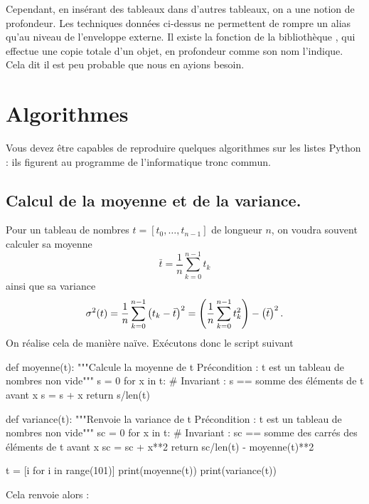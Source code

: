 Cependant, en insérant des tableaux dans d'autres tableaux, on a une notion de \og profondeur\fg. Les 
techniques données ci-dessus ne permettent de rompre un alias qu'au niveau de l'enveloppe externe. 
Il existe la fonction  de la bibliothèque , qui effectue une copie totale 
d'un objet, en profondeur comme son nom l'indique. Cela dit il est peu probable que nous en ayions 
besoin.

\section{Algorithmes}

Vous devez être capables de reproduire quelques algorithmes sur les listes Python : ils figurent 
au programme de l'informatique tronc commun.

\subsection{Calcul de la moyenne et de la variance.}
  Pour un tableau de nombres $t = [t_0,\dots,t_{n-1}]$ de longueur $n$, on voudra souvent calculer sa moyenne 
  \begin{equation*}
    \bar{t} = \dfrac{1}{n} \sum_{k=0}^{n-1} t_k 
  \end{equation*}
  ainsi que sa variance 
  \begin{equation*}
    \sigma^2(t) = \dfrac{1}{n} \sum_{k=0}^{n-1} \left( t_k - \bar{t}\right)^2 = \left( \dfrac{1}{n} \sum_{k=0}^{n-1} t_k^2\right) - \left( \bar{t}\right)^2. 
  \end{equation*}
  On réalise cela de manière naïve. Exécutons donc le script suivant

\begin{pyblock}
def moyenne(t):
    """Calcule la moyenne de t
       Précondition : t est un tableau de nombres non vide"""
    s = 0 
    for x in t:
        # Invariant : s == somme des éléments de t avant x
        s = s + x 
    return s/len(t)
    
def variance(t):
    """Renvoie la variance de t
       Précondition : t est un tableau de nombres non vide"""
    sc = 0
    for x in t:
        # Invariant : sc == somme des carrés des éléments de t avant x
        sc = sc + x**2 
    return sc/len(t) - moyenne(t)**2

t = [i for i in range(101)]
print(moyenne(t))
print(variance(t))
\end{pyblock}
Cela renvoie alors :
\begin{quote}
  \printpythontex[verb]
\end{quote}


